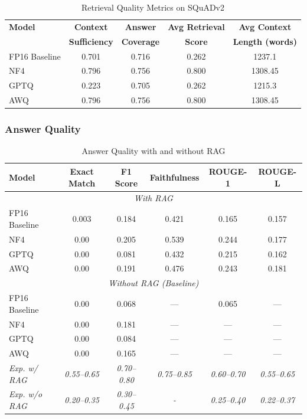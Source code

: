 \begin{table}[h]
\centering
\caption{Retrieval Quality Metrics on SQuADv2}
\label{tab:retrieval_quality}
\begin{tabular}{@{}lcccc@{}}
\toprule
\textbf{Model} & \textbf{Context} & \textbf{Answer} & \textbf{Avg Retrieval} & \textbf{Avg Context} \\
 & \textbf{Sufficiency} & \textbf{Coverage} & \textbf{Score} & \textbf{Length (words)} \\
\midrule
FP16 Baseline & 0.701 & 0.716 & 0.262 & 1237.1 \\
NF4 & 0.796 & 0.756 & 0.800 & 1308.45 \\
GPTQ & 0.223 & 0.705 & 0.262 & 1215.3 \\
AWQ & 0.796 & 0.756 & 0.800 & 1308.45 \\
\bottomrule
\end{tabular}
\end{table}

\subsubsection{Answer Quality}

\begin{table}[h]
\centering
\caption{Answer Quality with and without RAG}
\label{tab:answer_quality}
\begin{tabular}{@{}lccccc@{}}
\toprule
\textbf{Model} & \textbf{Exact Match} & \textbf{F1 Score} & \textbf{Faithfulness} & \textbf{ROUGE-1} & \textbf{ROUGE-L} \\
\midrule
\multicolumn{6}{c}{\textit{With RAG}} \\
\midrule
FP16 Baseline & 0.003 & 0.184 & 0.421 & 0.165 & 0.157 \\
NF4 & 0.00 & 0.205 & 0.539 & 0.244 & 0.177 \\
GPTQ & 0.00 & 0.081 & 0.432 & 0.215 & 0.162 \\
AWQ & 0.00 & 0.191 & 0.476 & 0.243 & 0.181 \\
\midrule
\multicolumn{6}{c}{\textit{Without RAG (Baseline)}} \\
\midrule
FP16 Baseline & 0.00 & 0.068& --- & 0.065 & --- \\
NF4 & 0.00 & 0.181 & --- & --- & --- \\
GPTQ & 0.00 & 0.084 & --- & --- & --- \\
AWQ & 0.00 & 0.165 & --- & --- & --- \\
\midrule
\textit{Exp. w/ RAG} & \textit{0.55--0.65} & \textit{0.70--0.80} & \textit{0.75--0.85} & \textit{0.60--0.70} & \textit{0.55--0.65} \\
\textit{Exp. w/o RAG} & \textit{0.20--0.35} & \textit{0.30--0.45} & \textit{-} & \textit{0.25--0.40} & \textit{0.22--0.37} \\
\bottomrule
\end{tabular}
\end{table}

